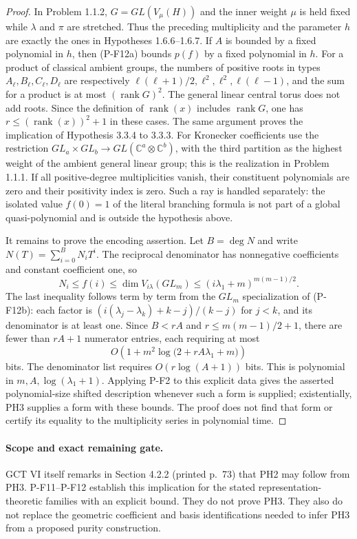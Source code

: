\documentclass[11pt,a4paper]{article}
\begin{document}
\begin{proof}
In Problem 1.1.2, $G=GL(V_\mu(H))$ and the inner weight $\mu$ is held
fixed while $\lambda$ and $\pi$ are stretched. Thus the preceding
multiplicity and the parameter $h$ are exactly the ones in
Hypotheses 1.6.6--1.6.7. If $A$ is bounded by a fixed polynomial in $h$,
then (P-F12a) bounds $p(f)$ by a fixed polynomial in $h$.
For a product of classical ambient groups, the numbers of positive
roots in types $A_\ell,B_\ell,C_\ell,D_\ell$ are respectively
$\ell(\ell+1)/2,\ell^2,\ell^2,\ell(\ell-1)$, and the sum for a product
is at most $(\operatorname{rank}G)^2$. The general linear central torus
does not add roots. Since the definition of $\operatorname{rank}(x)$
includes $\operatorname{rank}G$, one has
$r\le(\operatorname{rank}(x))^2+1$ in these cases.
The same argument proves the implication of Hypothesis 3.3.4 to 3.3.3.
For Kronecker coefficients use the restriction
$GL_a\times GL_b\to GL(\mathbb C^a\otimes\mathbb C^b)$, with the
third partition as the highest weight of the ambient general linear
group; this is the realization in Problem 1.1.1.
If all positive-degree multiplicities vanish, their constituent
polynomials are zero and their positivity index is zero. Such a ray
is handled separately: the isolated value $f(0)=1$ of the literal
branching formula is not part of a global quasi-polynomial and is
outside the hypothesis above.

It remains to prove the encoding assertion. Let $B=\deg N$ and write
$N(T)=\sum_{i=0}^B N_iT^i$. The reciprocal denominator has nonnegative
coefficients and constant coefficient one, so
\[
 N_i\le f(i)\le\dim V_{i\lambda}(GL_m)
 \le (i\lambda_1+m)^{m(m-1)/2}.
\]
The last inequality follows term by term from the $GL_m$ specialization
of (P-F12b): each factor is
$(i(\lambda_j-\lambda_k)+k-j)/(k-j)$ for $j<k$, and its denominator
is at least one. Since $B<rA$ and $r\le m(m-1)/2+1$, there are fewer
than $rA+1$ numerator entries, each requiring at most
\[
 O\!\left(1+m^2\log\bigl(2+rA\lambda_1+m\bigr)\right)
\]
bits. The denominator list requires $O(r\log(A+1))$ bits.
This is polynomial in $m,A,\log(\lambda_1+1)$.
Applying P-F2 to this explicit data gives the asserted polynomial-size
shifted description whenever such a form is supplied; existentially,
PH3 supplies a form with these bounds. The proof does not find that
form or certify its equality to the multiplicity series in polynomial
time.
\end{proof}

\paragraph{Scope and exact remaining gate.}
GCT VI itself remarks in Section 4.2.2 (printed p.~73) that PH2 may
follow from PH3. P-F11--P-F12 establish this implication for the stated
representation-theoretic families with an explicit bound. They do not
prove PH3. They also do not replace the geometric coefficient and basis
identifications needed to infer PH3 from a proposed purity construction.
\end{document}
